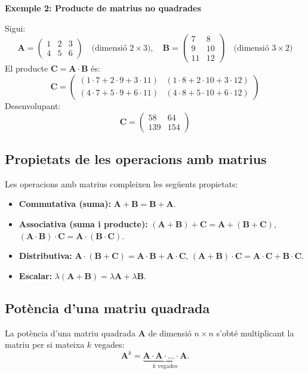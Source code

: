 \documentclass[12pt]{article}
\newcommand{\mat}[1]{\mathbf{#1}}
\begin{document}
\begin{exemple}
\textbf{Exemple 2: Producte de matrius no quadrades}

Sigui:
\[
\mat{A} = \begin{pmatrix}
1 & 2 & 3 \\
4 & 5 & 6
\end{pmatrix} \quad \text{(dimensió $2 \times 3$)},
\quad
\mat{B} = \begin{pmatrix}
7 & 8 \\
9 & 10 \\
11 & 12
\end{pmatrix} \quad \text{(dimensió $3 \times 2$)}
\]
El producte $\mat{C} = \mat{A} \cdot \mat{B}$ és:
\[
\mat{C} = \begin{pmatrix}
(1\cdot7 + 2\cdot9 + 3\cdot11) & (1\cdot8 + 2\cdot10 + 3\cdot12) \\
(4\cdot7 + 5\cdot9 + 6\cdot11) & (4\cdot8 + 5\cdot10 + 6\cdot12)
\end{pmatrix}
\]
Desenvolupant:
\[
\mat{C} = \begin{pmatrix}
58 & 64 \\
139 & 154
\end{pmatrix}
\]
\end{exemple}

\subsection{Propietats de les operacions amb matrius}
\begin{concept}
Les operacions amb matrius compleixen les següents propietats:
\begin{itemize}
    \item \textbf{Commutativa (suma):} $\mat{A} + \mat{B} = \mat{B} + \mat{A}$.
    \item \textbf{Associativa (suma i producte):} $(\mat{A} + \mat{B}) + \mat{C} = \mat{A} + (\mat{B} + \mat{C})$, $(\mat{A} \cdot \mat{B}) \cdot \mat{C} = \mat{A} \cdot (\mat{B} \cdot \mat{C})$.
    \item \textbf{Distributiva:} $\mat{A} \cdot (\mat{B} + \mat{C}) = \mat{A} \cdot \mat{B} + \mat{A} \cdot \mat{C}$, $(\mat{A} + \mat{B}) \cdot \mat{C} = \mat{A} \cdot \mat{C} + \mat{B} \cdot \mat{C}$.
    \item \textbf{Escalar:} $\lambda (\mat{A} + \mat{B}) = \lambda \mat{A} + \lambda \mat{B}$.
\end{itemize}
\end{concept}

\subsection{Potència d'una matriu quadrada}
\begin{concept}
La potència d'una matriu quadrada $\mat{A}$ de dimensió $n \times n$ s'obté multiplicant la matriu per si mateixa $k$ vegades:
\[
\mat{A}^k = \underbrace{\mat{A} \cdot \mat{A} \cdot \dots \cdot \mat{A}}_{k \text{ vegades}}.
\]
\end{concept}
\end{document}
